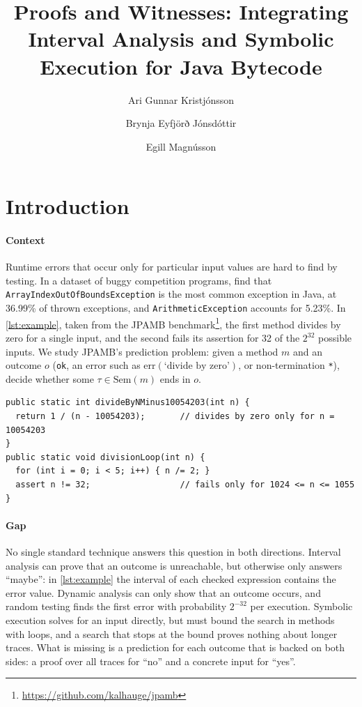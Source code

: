 \documentclass[review, nonacm, acmsmall]{acmart}
\title{Proofs and Witnesses: Integrating Interval Analysis and Symbolic Execution for Java Bytecode}
\author{Ari Gunnar Kristjónsson}
\author{Brynja Eyfjörð Jónsdóttir}
\author{Egill Magnússon}
\affiliation{%
  \institution{DTU Compute - Group 23}
  \city{Kgs. Lyngby}
  \country{Denmark}}
\begin{document}
\maketitle

\section{Introduction}

\paragraph{Context}
Runtime errors that occur only for particular input values are hard to find
by testing. In a dataset of buggy competition programs,
\citet{prenner2023runbugrun} find that
\texttt{ArrayIndexOutOf\-BoundsException} is the most common exception in Java,
at 36.99\% of thrown exceptions, and \texttt{ArithmeticException} accounts for
5.23\%. In \cref{lst:example}, taken from the JPAMB
benchmark\footnote{\url{https://github.com/kalhauge/jpamb}}, the first method
divides by zero for a single input, and the second fails its assertion for 32
of the $2^{32}$ possible inputs. We study JPAMB's prediction problem: given a method $m$ and an outcome $o$
(\texttt{ok}, an error such as $\mathrm{err}(\text{`divide by zero'})$, or
non-termination \texttt{*}), decide whether some $\tau \in \mathrm{Sem}(m)$
ends in $o$.

\begin{lstlisting}[float, label=lst:example, caption={Two JPAMB methods in which an error occurs only for specific values.}]
public static int divideByNMinus10054203(int n) {
  return 1 / (n - 10054203);       // divides by zero only for n = 10054203
}
public static void divisionLoop(int n) {
  for (int i = 0; i < 5; i++) { n /= 2; }
  assert n != 32;                  // fails only for 1024 <= n <= 1055
}
\end{lstlisting}

\paragraph{Gap}
No single standard technique answers this question in both directions.
Interval analysis can prove that an outcome is unreachable, but otherwise only
answers ``maybe'': in \cref{lst:example} the interval of each checked
expression contains the error value. Dynamic analysis can only show that an outcome occurs, and random testing
finds the first error with probability $2^{-32}$ per execution. Symbolic
execution solves for an input directly, but must bound the search in methods
with loops, and a search that stops at the bound proves nothing about longer
traces. What is missing is a prediction for each outcome that is backed on both
sides: a proof over all traces for ``no'' and a concrete input for ``yes''.
\end{document}
